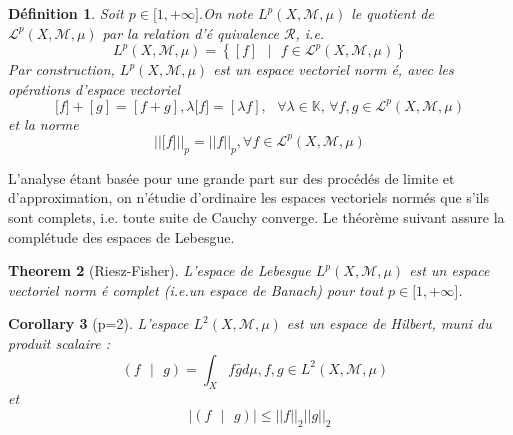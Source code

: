 \documentclass[3pt]{article}
\newtheorem{theorem}{Theorem}
\newtheorem{corollary}[theorem]{Corollary}
\newtheorem{definition}[theorem]{D\'{e}finition}
\begin{document}
\begin{definition}
Soit $p\in \lbrack 1,+\infty ]$.On note $L^{p}(X,\mathcal{M},\mu )$ le
quotient de $\mathcal{L}^{p}(X,\mathcal{M},\mu )$ par la relation d'\'{e}%
quivalence $\mathcal{R}$, i.e.%
\begin{equation*}
L^{p}(X,\mathcal{M},\mu )=\left\{ [f]\text{ }|\text{\ }f\in \mathcal{L}%
^{p}(X,\mathcal{M},\mu )\right\} 
\end{equation*}%
Par construction, $L^{p}(X,\mathcal{M},\mu )$ est un espace vectoriel norm%
\'{e}, avec les op\'{e}rations d'espace vectoriel%
\begin{equation*}
\lbrack f]+[g]=[f+g],\lambda \lbrack f]=[\lambda f],\text{ }\forall \lambda
\in \mathbb{K}\text{, }\forall f,g\in \mathcal{L}^{p}(X,\mathcal{M},\mu )
\end{equation*}%
et la norme%
\begin{equation*}
\left\vert \left\vert \lbrack f]\right\vert \right\vert _{p}=\left\vert
\left\vert f\right\vert \right\vert _{p},\forall f\in \mathcal{L}^{p}(X,%
\mathcal{M},\mu )
\end{equation*}
\end{definition}

\bigskip 

L'analyse \'{e}tant bas\'{e}e pour une grande part sur des proc\'{e}d\'{e}s
de limite et d'approximation, on n'\'{e}tudie d'ordinaire les espaces
vectoriels norm\'{e}s que s'ils sont complets, i.e. toute suite de Cauchy
converge. Le th\'{e}or\`{e}me suivant assure la compl\'{e}tude des espaces
de Lebesgue.

\bigskip 

\begin{theorem}[Riesz-Fisher]
L'espace de Lebesgue $L^{p}(X,\mathcal{M},\mu )$ est un espace vectoriel norm%
\'{e} complet (i.e.un espace de Banach) pour tout $p\in \lbrack 1,+\infty ]$.
\end{theorem}

\bigskip 

\begin{corollary}[p=2]
L'espace $L^{2}(X,\mathcal{M},\mu )$ est un espace de Hilbert, muni du
produit scalaire :%
\begin{equation*}
\left( f\text{ }|\text{ }g\right) =\int_{X}f\bar{g}d\mu ,f,g\in L^{2}(X,%
\mathcal{M},\mu )\text{ }
\end{equation*}%
et%
\begin{equation*}
\left\vert \left( f\text{ }|\text{ }g\right) \right\vert \leq \left\vert
\left\vert f\right\vert \right\vert _{2}\left\vert \left\vert g\right\vert
\right\vert _{2}
\end{equation*}
\end{corollary}
\end{document}
